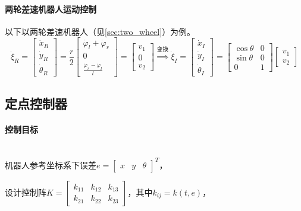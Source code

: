 \documentclass[
12pt, %
a4paper, 
oneside, %
headinclude,footinclude, %
]{scrartcl}
\begin{document}
\paragraph{两轮差速机器人运动控制}
以下以两轮差速机器人（见\ref{sec:two_wheel}）为例。
$$ 
\dot{\xi}_R = \begin{bmatrix} \dot{x}_R \\ \dot{y}_R \\ \dot{\theta}_R \end{bmatrix} = \frac{r}{2} \begin{bmatrix} \dot{\varphi}_l + \dot{\varphi}_r \\ 0 \\ \frac{\dot{\varphi}_r-\dot{\varphi}_l}{l} \end{bmatrix} = \begin{bmatrix} v_1 \\ 0 \\ v_2 \end{bmatrix} 
\overset{\text{变换}}{\Longrightarrow}
\dot{\xi}_I = \begin{bmatrix} \dot{x}_I \\ \dot{y}_I \\ \dot{\theta}_I \end{bmatrix} = \begin{bmatrix} \cos\theta & 0 \\ \sin\theta & 0 \\ 0 & 1 \end{bmatrix} \begin{bmatrix} v_1 \\ v_2 \end{bmatrix} 
$$
\subsection[定点控制器]{定点控制器}
\paragraph{控制目标}~\\

机器人参考坐标系下误差$ e = \begin{bmatrix} x & y & \theta \end{bmatrix}^T $，

设计控制阵$ K = \begin{bmatrix} k_{11} & k_{12} & k_{13} \\ k_{21} & k_{22} & k_{23} \end{bmatrix} $，其中$ k_{ij} = k(t, e) $，
\end{document}
